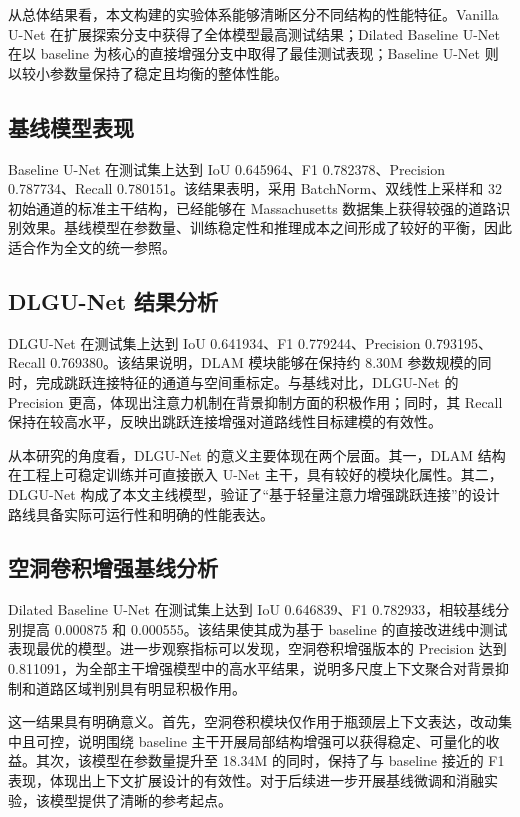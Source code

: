 \documentclass[12pt,a4paper]{ctexart}
\begin{document}
从总体结果看，本文构建的实验体系能够清晰区分不同结构的性能特征。Vanilla U-Net 在扩展探索分支中获得了全体模型最高测试结果；Dilated Baseline U-Net 在以 baseline 为核心的直接增强分支中取得了最佳测试表现；Baseline U-Net 则以较小参数量保持了稳定且均衡的整体性能。

\subsection{基线模型表现}
Baseline U-Net 在测试集上达到 IoU 0.645964、F1 0.782378、Precision 0.787734、Recall 0.780151。该结果表明，采用 BatchNorm、双线性上采样和 32 初始通道的标准主干结构，已经能够在 Massachusetts 数据集上获得较强的道路识别效果。基线模型在参数量、训练稳定性和推理成本之间形成了较好的平衡，因此适合作为全文的统一参照。

\subsection{DLGU-Net 结果分析}
DLGU-Net 在测试集上达到 IoU 0.641934、F1 0.779244、Precision 0.793195、Recall 0.769380。该结果说明，DLAM 模块能够在保持约 8.30M 参数规模的同时，完成跳跃连接特征的通道与空间重标定。与基线对比，DLGU-Net 的 Precision 更高，体现出注意力机制在背景抑制方面的积极作用；同时，其 Recall 保持在较高水平，反映出跳跃连接增强对道路线性目标建模的有效性。

从本研究的角度看，DLGU-Net 的意义主要体现在两个层面。其一，DLAM 结构在工程上可稳定训练并可直接嵌入 U-Net 主干，具有较好的模块化属性。其二，DLGU-Net 构成了本文主线模型，验证了“基于轻量注意力增强跳跃连接”的设计路线具备实际可运行性和明确的性能表达。

\subsection{空洞卷积增强基线分析}
Dilated Baseline U-Net 在测试集上达到 IoU 0.646839、F1 0.782933，相较基线分别提高 0.000875 和 0.000555。该结果使其成为基于 baseline 的直接改进线中测试表现最优的模型。进一步观察指标可以发现，空洞卷积增强版本的 Precision 达到 0.811091，为全部主干增强模型中的高水平结果，说明多尺度上下文聚合对背景抑制和道路区域判别具有明显积极作用。

这一结果具有明确意义。首先，空洞卷积模块仅作用于瓶颈层上下文表达，改动集中且可控，说明围绕 baseline 主干开展局部结构增强可以获得稳定、可量化的收益。其次，该模型在参数量提升至 18.34M 的同时，保持了与 baseline 接近的 F1 表现，体现出上下文扩展设计的有效性。对于后续进一步开展基线微调和消融实验，该模型提供了清晰的参考起点。
\end{document}
